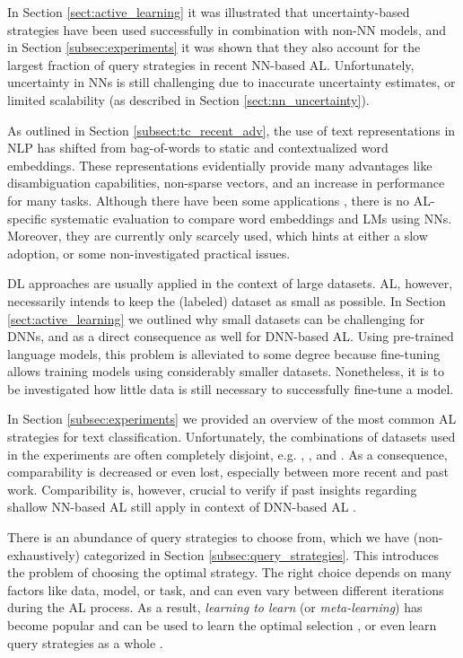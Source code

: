 In Section \ref{sect:active_learning} it was illustrated that uncertainty-based strategies 
have been used successfully in combination with non-NN models, and in Section \ref{subsec:experiments} it was shown that they also account for the largest fraction of query strategies in recent NN-based AL. 
Unfortunately, uncertainty in NNs is still challenging due to inaccurate uncertainty estimates, or limited scalability (as described in Section \ref{sect:nn_uncertainty}).

As outlined in Section \ref{subsect:tc_recent_adv}, the use of text representations in NLP has shifted from bag-of-words to static and contextualized word embeddings.
These representations evidentially provide many advantages like disambiguation capabilities, non-sparse vectors, and an increase in performance for many tasks.
Although there have been some applications , there is no AL-specific systematic evaluation to compare word embeddings and LMs using NNs.
Moreover, they are currently only scarcely used,
which hints at either a slow adoption, or some non-investigated practical issues.

DL approaches are usually applied in the context of large datasets.
AL, however, necessarily intends to keep the (labeled) dataset as small as possible.
In Section \ref{sect:active_learning} we outlined why small datasets can be challenging for DNNs, and as a direct consequence as well for DNN-based AL.
Using pre-trained language models, this problem is alleviated to some degree because fine-tuning allows training models using considerably smaller datasets.
Nonetheless, it is to be investigated how little data is still necessary to successfully fine-tune a model.

In Section \ref{subsec:experiments} we provided an overview of the most common AL strategies for text classification.
Unfortunately, the combinations of datasets used in the experiments are often completely disjoint, e.g. \textcite{siddhant2018deep}, \textcite{lowell2019practical}, and \textcite{prabhu2019sampling}.
As a consequence, comparability is decreased or even lost, especially between more recent and past work.
Comparibility is, however, crucial to verify if past insights regarding shallow NN-based AL still apply in context of DNN-based AL .

There is an abundance of query strategies to choose from, which we have (non-exhaustively) categorized in Section \ref{subsec:query_strategies}.
This introduces the problem of choosing the optimal strategy.
The right choice depends on many factors like data, model, or task, and can even vary between different iterations during the AL process.
As a result, {\em learning to learn} (or {\em meta-learning}) has become popular and can be used to learn the optimal selection , or even learn query strategies as a whole .

